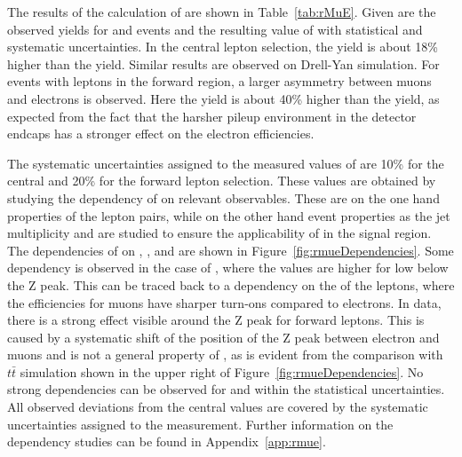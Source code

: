 The results of the calculation of \rmue are shown in Table~\ref{tab:rMuE}. Given are the observed yields for \MM and \EE events and the resulting value of \rmue with statistical and systematic uncertainties. In the central lepton selection, the \MM yield is about 18\% higher than the \EE yield. Similar results are observed on Drell-Yan simulation. For events with leptons in the forward region, a larger asymmetry between muons and electrons is observed. Here the \MM yield is about 40\% higher than the \EE yield, as expected from the fact that the harsher pileup environment in the detector endcaps has a stronger effect on the electron efficiencies. 

The systematic uncertainties assigned to the measured values of \rmue are 10\% for the central and 20\% for the forward lepton selection. These values are obtained by studying the dependency of \rmue on relevant observables. These are on the one hand properties of the lepton pairs, while on the other hand event properties as the jet multiplicity and \MET are studied to ensure the applicability of \rmue in the signal region. The dependencies of \rmue on \mll, \MET, and \njets are shown in Figure~\ref{fig:rmueDependencies}. Some dependency is observed in the case of \mll, where the values are higher for low \mll below the Z peak. This can be traced back to a dependency on the \pt of the leptons, where the efficiencies for muons have sharper turn-ons compared to electrons. In data, there is a strong effect visible around the Z peak for forward leptons. This is caused by a systematic shift of the position of the Z peak between electron and muons and is not a general property of \rmue, as is evident from the comparison with $t\bar{t}$ simulation shown in the upper right of Figure~\ref{fig:rmueDependencies}. No strong dependencies can be observed for \MET and \njets within the statistical uncertainties. All observed deviations from the central values are covered by the systematic uncertainties assigned to the measurement. Further information on the dependency studies can be found in Appendix~\ref{app:rmue}.
